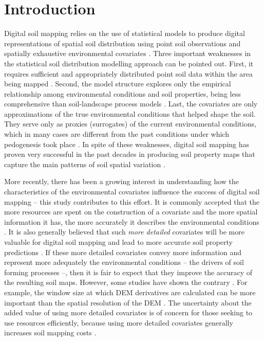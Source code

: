 \formatchapter

\section{Introduction}
\label{sec:intro}

Digital soil mapping relies on the use of statistical models to produce digital representations of spatial soil 
distribution using point soil observations and spatially exhaustive environmental covariates 
\cite{McBratneyEtAl2003, ScullEtAl2003, Florinsky2012}. Three important weaknesses in the statistical 
soil distribution modelling approach can be pointed out. First, it requires sufficient and appropriately 
distributed point soil data within the area being mapped \cite{CarreEtAl2007a}. Second, the model structure 
explores only the empirical relationship among environmental conditions and soil properties, being
less comprehensive than soil-landscape process models \cite{Grunwald2009}. Last, the covariates are only 
approximations of the true environmental conditions that helped shape the soil. They serve only as proxies 
(surrogates) of the current environmental conditions, which in many cases are different from the past 
conditions under which pedogenesis took place \cite{HeuvelinkEtAl2001}. In spite of these weaknesses, digital 
soil mapping has proven very successful in the past decades in producing soil property maps that capture the 
main patterns of soil spatial variation \cite{MooreEtAl1993, McBratneyEtAl2000, Grunwald2009}.

More recently, there has been a growing interest in understanding how the characteristics of the environmental 
covariates influence the success of digital soil mapping -- this study contributes to this effort. It is 
commonly accepted that the more resources are spent on the construction of a covariate and the more spatial 
information it has, the more accurately it describes the environmental conditions \cite{HupyEtAl2004, 
HenglEtAl2013a}. It is also generally believed that such \textit{more detailed} covariates will be more 
valuable for digital soil mapping and lead to more accurate soil property predictions \cite{CavazziEtAl2013, 
MaynardEtAl2014}. If these more detailed covariates convey more information and represent more adequately the 
environmental conditions -- the drivers of soil forming processes --, then it is fair to expect that they 
improve the accuracy of the resulting soil maps. However, some studies have shown the contrary 
\cite{ThompsonEtAl2001, EldeiryEtAl2008, KimEtAl2014}. For example, the window size at which DEM derivatives 
are calculated can be more important than the spatial resolution of the DEM \cite{Wood1996, ZhuEtAl2008, 
BehrensEtAl2010a}. The uncertainty about the added value of using more detailed covariates is of concern for 
those seeking to use resources efficiently, because using more detailed covariates generally increases soil 
mapping costs \cite{ShiEtAl2012}.

